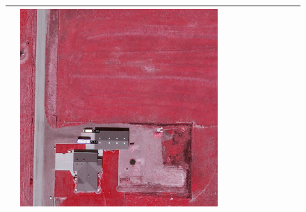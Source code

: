 \begin{figure}[H]
\begin{tabularx}{\textwidth}{c|*{9}{X}}
    & \includegraphics[trim={300pt 355pt 610pt 570pt},clip,width=\linewidth]{images/015Results/02perm_exp/comp_images/irgb/198.png} \\ \hline


\end{tabularx}
\end{figure}
